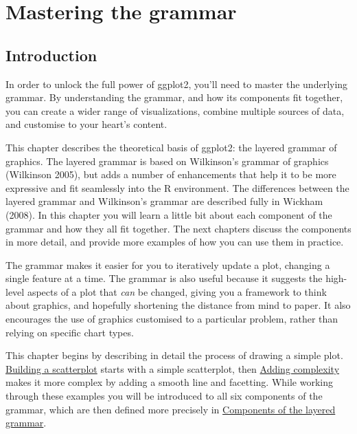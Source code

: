 \chapter{Mastering the grammar}\label{cha:mastery}

\section{Introduction}

In order to unlock the full power of ggplot2, you'll need to master the
underlying grammar. By understanding the grammar, and how its components
fit together, you can create a wider range of visualizations, combine
multiple sources of data, and customise to your heart's content.

This chapter describes the theoretical basis of ggplot2: the layered
grammar of graphics. The layered grammar is based on Wilkinson's grammar
of graphics (Wilkinson 2005), but adds a number of enhancements that
help it to be more expressive and fit seamlessly into the R environment.
The differences between the layered grammar and Wilkinson's grammar are
described fully in Wickham (2008). In this chapter you will learn a
little bit about each component of the grammar and how they all fit
together. The next chapters discuss the components in more detail, and
provide more examples of how you can use them in practice.

The grammar makes it easier for you to iteratively update a plot,
changing a single feature at a time. The grammar is also useful because
it suggests the high-level aspects of a plot that \emph{can} be changed,
giving you a framework to think about graphics, and hopefully shortening
the distance from mind to paper. It also encourages the use of graphics
customised to a particular problem, rather than relying on specific
chart types.

This chapter begins by describing in detail the process of drawing a
simple plot. \hyperref[sec:simple-plot]{Building a scatterplot} starts
with a simple scatterplot, then \hyperref[sec:complex-plot]{Adding
complexity} makes it more complex by adding a smooth line and facetting.
While working through these examples you will be introduced to all six
components of the grammar, which are then defined more precisely in
\hyperref[sec:components]{Components of the layered grammar}.


